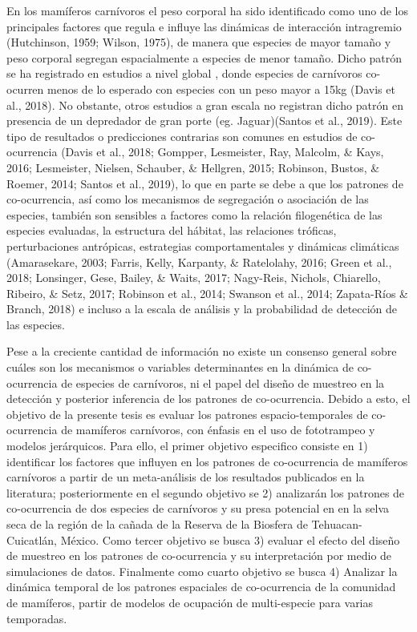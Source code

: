 \documentclass[12pt,twoside]{reedthesis}
\begin{document}
En los mamíferos carnívoros el peso corporal ha sido identificado como uno de los principales factores que regula e influye las dinámicas
de interacción intragremio (Hutchinson, 1959; Wilson, 1975), de manera que especies de mayor tamaño y peso corporal segregan espacialmente a especies de menor tamaño. Dicho patrón se ha registrado en estudios a nivel global , donde especies de carnívoros co-ocurren menos de lo esperado con especies con un peso mayor a 15kg (Davis et al., 2018). No obstante, otros estudios a gran escala no registran dicho patrón en presencia de un depredador de gran porte (eg. Jaguar)(Santos et al., 2019). Este tipo de resultados o predicciones contrarias son comunes en estudios de co-ocurrencia (Davis et al., 2018; Gompper, Lesmeister, Ray, Malcolm, \& Kays, 2016; Lesmeister, Nielsen, Schauber, \& Hellgren, 2015; Robinson, Bustos, \& Roemer, 2014; Santos et al., 2019), lo que en parte se debe a que los patrones de co-ocurrencia, así como los mecanismos de segregación o asociación de las especies, también son sensibles a factores como la relación filogenética de las especies evaluadas, la estructura del hábitat, las relaciones tróficas, perturbaciones antrópicas, estrategias comportamentales y dinámicas climáticas (Amarasekare, 2003; Farris, Kelly, Karpanty, \& Ratelolahy, 2016; Green et al., 2018; Lonsinger, Gese, Bailey, \& Waits, 2017; Nagy-Reis, Nichols, Chiarello, Ribeiro, \& Setz, 2017; Robinson et al., 2014; Swanson et al., 2014; Zapata-Ríos \& Branch, 2018) e incluso a la escala de análisis y la probabilidad de detección de las especies.

Pese a la creciente cantidad de información no existe un consenso general sobre cuáles son los mecanismos o variables determinantes en la dinámica de co-ocurrencia de especies de carnívoros, ni el papel del diseño de muestreo en la detección y posterior inferencia de los patrones de co-ocurrencia. Debido a esto, el objetivo de la presente tesis es evaluar los patrones espacio-temporales de co-ocurrencia de mamíferos carnívoros, con énfasis en el uso de fototrampeo y modelos jerárquicos. Para ello, el primer objetivo especifico consiste en 1) identificar los factores que influyen en los patrones de co-ocurrencia de mamíferos carnívoros a partir de un meta-análisis de los resultados publicados en la literatura; posteriormente en el segundo objetivo se 2) analizarán los patrones de co-ocurrencia de dos especies de carnívoros y su presa potencial en en la selva seca de la región de la cañada de la Reserva de la Biosfera de Tehuacan-Cuicatlán, México. Como tercer objetivo se busca 3) evaluar el efecto del diseño de muestreo en los patrones de co-ocurrencia y su interpretación por medio de simulaciones de datos. Finalmente como cuarto objetivo se busca 4) Analizar la dinámica temporal de los patrones espaciales de co-ocurrencia de la comunidad de mamíferos, partir de modelos de ocupación de multi-especie para varias temporadas.
\end{document}

